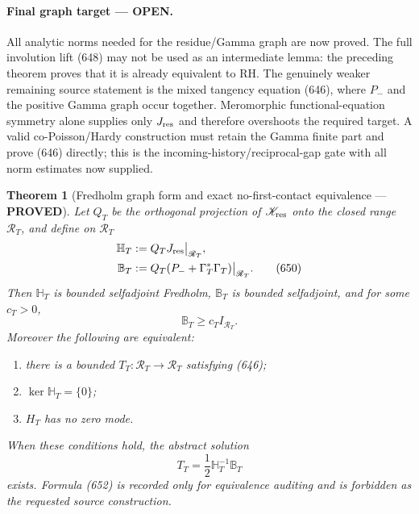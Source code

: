\documentclass[11pt]{article}
\newtheorem{theorem}{Theorem}
\newcommand{\PROVED}{\textcolor{green!45!black}{\textbf{PROVED}}}
\newcommand{\OPEN}{\textcolor{red!70!black}{\textbf{OPEN}}}
\begin{document}
\paragraph{Final graph target --- \OPEN.}
All analytic norms needed for the residue/Gamma graph are now proved.
The full involution lift (648) may not be used as an intermediate lemma:
the preceding theorem proves that it is already equivalent to RH.  The
genuinely weaker remaining source statement is the mixed tangency equation
(646), where \(P_-\) and the positive Gamma graph occur together.
Meromorphic functional-equation symmetry alone supplies only \(J_{\rm res}\)
and therefore overshoots the required target.  A valid co-Poisson/Hardy
construction must retain the Gamma finite part and prove (646) directly;
this is the incoming-history/reciprocal-gap gate with all norm estimates
now supplied.

\begin{theorem}[Fredholm graph form and exact no-first-contact equivalence
--- \PROVED]
Let \(Q_T\) be the orthogonal projection of
\(\mathscr K_{\rm res}\) onto the closed range \(\mathscr R_T\), and define
on \(\mathscr R_T\)
\begin{align}
 \mathbb H_T&:=Q_TJ_{\rm res}\big|_{\mathscr R_T},\notag\\
 \mathbb B_T&:=Q_T(P_-+\Gamma_T^*\Gamma_T)
                    \big|_{\mathscr R_T}.            \tag{650}
\end{align}
Then \(\mathbb H_T\) is bounded selfadjoint Fredholm,
\(\mathbb B_T\) is bounded selfadjoint, and for some \(c_T>0\),
\begin{equation}
 \mathbb B_T\ge c_TI_{\mathscr R_T}.                 \tag{651}
\end{equation}
Moreover the following are equivalent:
\begin{enumerate}
\item there is a bounded \(T_T:\mathscr R_T\to\mathscr R_T\)
      satisfying (646);
\item \(\ker\mathbb H_T=\{0\}\);
\item \(H_T\) has no zero mode.
\end{enumerate}
When these conditions hold, the abstract solution
\begin{equation}
 T_T=\frac12\mathbb H_T^{-1}\mathbb B_T              \tag{652}
\end{equation}
exists.  Formula (652) is recorded only for equivalence auditing and is
forbidden as the requested source construction.
\end{theorem}
\end{document}
